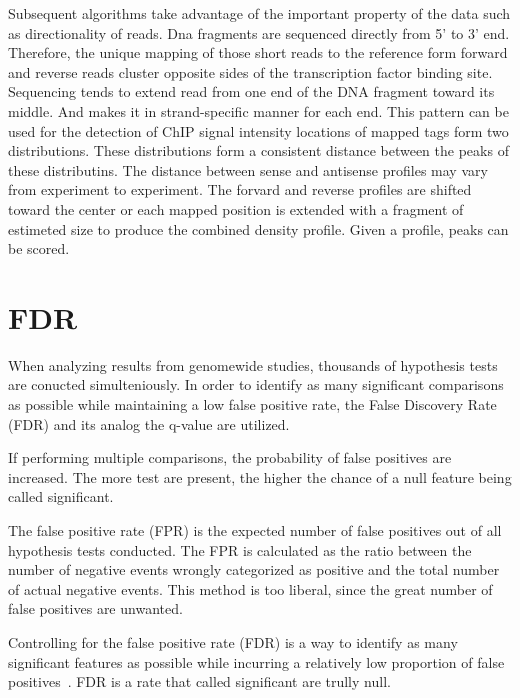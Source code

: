 Subsequent algorithms take advantage of the important property of the data such as directionality of reads.
Dna fragments are sequenced directly from 5' to 3' end.
Therefore, the unique mapping of those short reads to the reference form forward and reverse reads cluster opposite sides of the transcription factor binding site.
Sequencing tends to extend read from one end of the DNA fragment toward its middle.
And makes it in strand-specific manner for each end. 
This pattern can be used for the detection of ChIP signal intensity locations of mapped tags form two distributions.
These distributions form a consistent distance between the peaks of these distributins.
The distance between sense and antisense profiles may vary from experiment to experiment.
The forvard and reverse profiles are shifted toward the center or each mapped position is extended with a fragment of estimeted size to produce the combined density profile.
Given a profile, peaks can be scored.

\section{FDR}

When analyzing results from genomewide studies, thousands of hypothesis tests are conucted simulteniously.
In order to identify as many significant comparisons as possible while maintaining a low false positive rate, the False Discovery Rate (FDR) and its analog the q-value are utilized.

If performing multiple comparisons, the probability of false positives are increased.
The more test are present, the higher the chance of a null feature being called significant.

The false positive rate (FPR) is the expected number of false positives out of all hypothesis tests conducted.
The FPR is calculated as the ratio between the number of negative events wrongly categorized as positive and the total number of actual negative events.
This method is too liberal, since the great number of false positives are unwanted.

Controlling for the false positive rate (FDR) is a way to identify as many significant features as possible while incurring a relatively low proportion of false positives~\cite{benjamini1995controlling}.
FDR is a rate that called significant are trully null.

